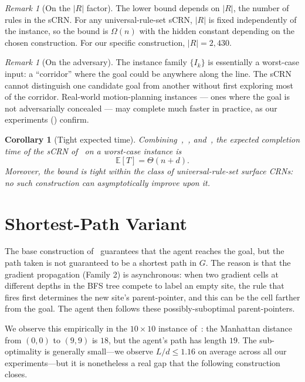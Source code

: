 \documentclass[11pt]{article}
\theoremstyle{plain}
\newtheorem{corollary}[theorem]{Corollary}
\theoremstyle{definition}
\theoremstyle{remark}
\newtheorem{remark}[theorem]{Remark}
\begin{document}
\begin{remark}[On the $|R|$ factor]
\label{rem:R-factor}
The lower bound depends on $|R|$, the number of rules in the sCRN. For any universal-rule-set sCRN, $|R|$ is fixed independently of the instance, so the bound is $\Omega(n)$ with the hidden constant depending on the chosen construction. For our specific construction, $|R| = 2{,}430$.
\end{remark}

\begin{remark}[On the adversary]
\label{rem:adversary}
The instance family $\{I_k\}$ is essentially a worst-case input: a ``corridor'' where the goal could be anywhere along the line. The sCRN cannot distinguish one candidate goal from another without first exploring most of the corridor. Real-world motion-planning instances --- ones where the goal is not adversarially concealed --- may complete much faster in practice, as our experiments () confirm.
\end{remark}

\begin{corollary}[Tight expected time]
\label{cor:tight}
Combining~,~, and~, the expected completion time of the sCRN of~ on a worst-case instance is
\[
\mathbb{E}[T] = \Theta(n + d).
\]
Moreover, the bound is tight within the class of universal-rule-set surface CRNs: no such construction can asymptotically improve upon it.
\end{corollary}

\section{Shortest-Path Variant}
\label{sec:shortest}

The base construction of~ guarantees that the agent reaches the goal, but the path taken is not guaranteed to be a shortest path in $G$. The reason is that the gradient propagation (Family 2) is asynchronous: when two gradient cells at different depths in the BFS tree compete to label an empty site, the rule that fires first determines the new site's parent-pointer, and this can be the cell farther from the goal. The agent then follows these possibly-suboptimal parent-pointers.

We observe this empirically in the $10\times10$ instance of~: the Manhattan distance from $(0,0)$ to $(9,9)$ is $18$, but the agent's path has length $19$. The sub-optimality is generally small—we observe $L/d \leq 1.16$ on average across all our experiments—but it is nonetheless a real gap that the following construction closes.
\end{document}
